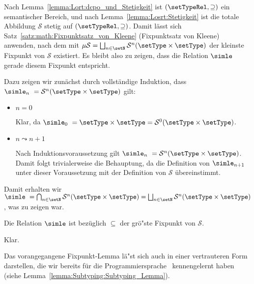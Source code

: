 \begin{beweis}
  Nach Lemma~\ref{lemma:Lort:dcpo_und_Stetigkeit} ist $(\setTypeRel,\supseteq)$ ein semantischer Bereich,
  und nach Lemma~\ref{lemma:Losrt:Stetigkeit} ist die totale Abbildung $\mathcal{S}$ stetig auf
  $(\setTypeRel,\supseteq)$. Damit l\"asst sich Satz~\ref{satz:math:Fixpunktsatz_von_Kleene} (Fixpunktsatz von Kleene)
  anwenden, nach dem mit $\mu\mathcal{S} = \bigsqcup_{n\in\setN} \mathcal{S}^n(\setType \times \setType)$ der kleinste Fixpunkt
  von $\mathcal{S}$ existiert. Es bleibt also zu zeigen, dass die Relation $\simle$ gerade diesem Fixpunkt entspricht.

  Dazu zeigen wir zun\"achst durch vollst\"andige Induktion, dass $\simle_n\ = \mathcal{S}^n(\setType \times \setType)$ gilt:
  \begin{itemize}
    \item $n = 0$

          Klar, da $\simle_0\ = \setType \times \setType = \mathcal{S}^0(\setType \times \setType)$.

    \item $n \leadsto n+1$

          Nach Induktionsvoraussetzung gilt $\simle_n\ = \mathcal{S}^n(\setType \times \setType)$. Damit folgt
          trivialerweise die Behauptung, da die Definition von $\simle_{n+1}$ unter dieser Voraussetzung mit
          der Definition von $\mathcal{S}$ \"ubereinstimmt.
  \end{itemize}
  Damit erhalten wir
  $\simle\ 
   = \bigcap_{n\in\setN} \mathcal{S}^n(\setType \times \setType)
   = \bigsqcup_{n\in\setN} \mathcal{S}^n(\setType \times \setType)$,
  was zu zeigen war.
\end{beweis}

\begin{korollar}
  Die Relation $\simle$ ist bez\"uglich $\subseteq$ der gr\"o"ste Fixpunkt von $\mathcal{S}$.
\end{korollar}

\begin{beweis}
  Klar.
\end{beweis}

Das vorangegangene Fixpunkt-Lemma l\"a"st sich auch in einer vertrauteren Form darstellen, die wir
bereits f\"ur die Programmiersprache \Losub\ kennengelernt haben (siehe Lemma~\ref{lemma:Subtyping:Subtyping_Lemma}).

